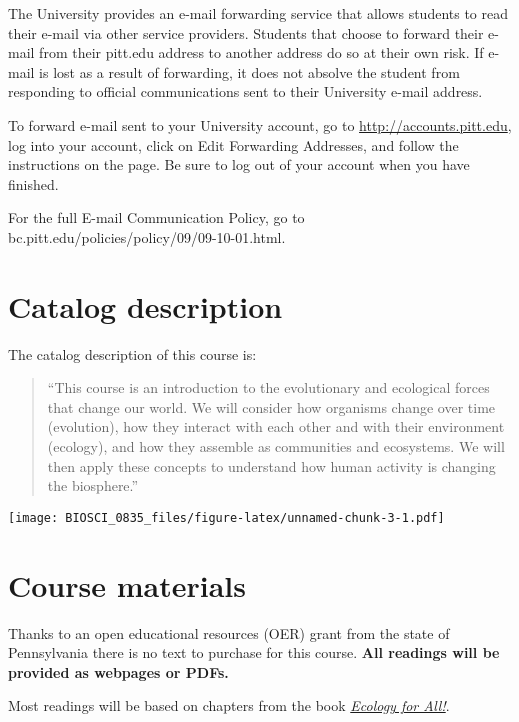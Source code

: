 \documentclass[
]{book}
\begin{document}
The University provides an e-mail forwarding service that allows students to read their e-mail via other service providers. Students that choose to forward their e-mail from their pitt.edu address to another address do so at their own risk. If e-mail is lost as a result of forwarding, it does not absolve the student from responding to official communications sent to their University e-mail address.

To forward e-mail sent to your University account, go to \url{http://accounts.pitt.edu}, log into your account, click on Edit Forwarding Addresses, and follow the instructions on the page. Be sure to log out of your account when you have finished.

For the full E-mail Communication Policy, go to bc.pitt.edu/policies/policy/09/09-10-01.html.

\hypertarget{catalog-description}{%
\chapter{Catalog description}\label{catalog-description}}

The catalog description of this course is:

\begin{quote}
``This course is an introduction to the evolutionary and ecological forces that change our world. We will consider how organisms change over time (evolution), how they interact with each other and with their environment (ecology), and how they assemble as communities and ecosystems. We will then apply these concepts to understand how human activity is changing the biosphere.''
\end{quote}

\texttt{[image: BIOSCI\_0835\_files/figure-latex/unnamed-chunk-3-1.pdf]}

\hypertarget{course-materials}{%
\chapter{Course materials}\label{course-materials}}

Thanks to an open educational resources (OER) grant from the state of Pennsylvania there is no text to purchase for this course. \textbf{All readings will be provided as webpages or PDFs.}

Most readings will be based on chapters from the book \href{https://bio.libretexts.org/Courses/Gettysburg_College/01\%3A_Ecology_for_All}{\emph{Ecology for All!}}.
\end{document}
